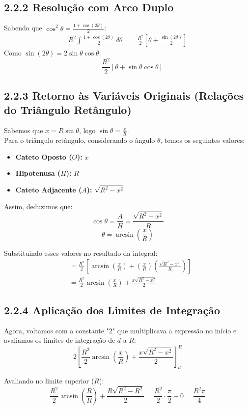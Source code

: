 \documentclass[12pt,a4paper]{article}
\begin{document}
\subsection*{2.2.2 Resolução com Arco Duplo}
Sabendo que $\cos^2 \theta = \frac{1 + \cos(2\theta)}{2}$:
\begin{align*}
R^2 \int \frac{1 + \cos(2\theta)}{2} \, d\theta &= \frac{R^2}{2} \left[ \theta + \frac{\sin(2\theta)}{2} \right]
\end{align*}
Como $\sin(2\theta) = 2 \sin \theta \cos \theta$:
\[ = \frac{R^2}{2} [ \theta + \sin \theta \cos \theta ] \]

\subsection*{2.2.3 Retorno às Variáveis Originais (Relações do Triângulo Retângulo)}
Sabemos que $x = R \sin \theta$, logo $\sin \theta = \frac{x}{R}$. \\
Para o triângulo retângulo, considerando o ângulo $\theta$, temos os seguintes valores:
\begin{itemize}
    \item \textbf{Cateto Oposto ($O$):} $x$
    \item \textbf{Hipotenusa ($H$):} $R$
    \item \textbf{Cateto Adjacente ($A$):} $\sqrt{R^2 - x^2}$
\end{itemize}
Assim, deduzimos que:
\[ \cos \theta = \frac{A}{H} = \frac{\sqrt{R^2 - x^2}}{R} \]
\[ \theta = \arcsin\left(\frac{x}{R}\right) \]

Substituindo esses valores no resultado da integral:
\begin{align*}
&= \frac{R^2}{2} \left[ \arcsin\left(\frac{x}{R}\right) + \left(\frac{x}{R}\right)\left(\frac{\sqrt{R^2 - x^2}}{R}\right) \right] \\
&= \frac{R^2}{2} \arcsin\left(\frac{x}{R}\right) + \frac{x \sqrt{R^2 - x^2}}{2}
\end{align*}

\subsection*{2.2.4 Aplicação dos Limites de Integração}
Agora, voltamos com a constante "2" que multiplicava a expressão no início e avaliamos os limites de integração de $d$ a $R$:
\[ 2 \left[ \frac{R^2}{2} \arcsin\left(\frac{x}{R}\right) + \frac{x \sqrt{R^2 - x^2}}{2} \right]_{d}^{R} \]

Avaliando no limite superior ($R$):
\[ \frac{R^2}{2} \arcsin\left(\frac{R}{R}\right) + \frac{R \sqrt{R^2 - R^2}}{2} = \frac{R^2}{2} \cdot \frac{\pi}{2} + 0 = \frac{R^2 \pi}{4} \]
\end{document}
